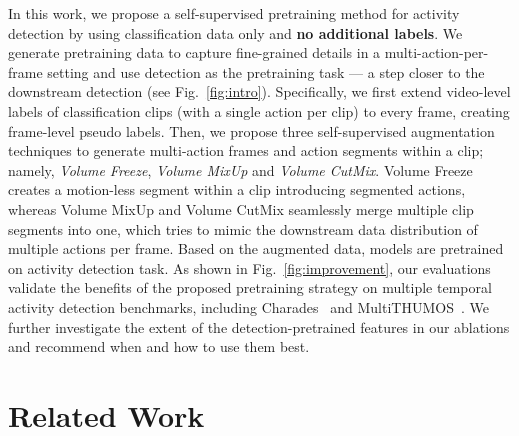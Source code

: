 \documentclass[10pt,twocolumn,letterpaper]{article}
\newcommand{\fref}[1]{Fig.~\ref{#1}}
\begin{document}
In this work, we propose a self-supervised pretraining method for activity detection by using classification data only and \textbf{no additional labels}. We generate pretraining data to capture fine-grained details in a multi-action-per-frame setting and use detection as the pretraining task --- a step closer to the downstream detection (see \fref{fig:intro}). Specifically, we first extend video-level labels of classification clips (with a single action per clip) to every frame, creating frame-level pseudo labels. Then, we propose three self-supervised augmentation techniques to generate multi-action frames and action segments within a clip; namely, \textit{Volume Freeze}, \textit{Volume MixUp} and \textit{Volume CutMix}. Volume Freeze creates a motion-less segment within a clip introducing segmented actions, whereas Volume MixUp and Volume CutMix seamlessly merge multiple clip segments into one, which tries to mimic the downstream data distribution of multiple actions per frame. Based on the augmented data, models are pretrained on activity detection task. As shown in \fref{fig:improvement}, our evaluations validate the benefits of the proposed pretraining strategy on multiple temporal activity detection benchmarks, including Charades~\cite{sigurdsson2016hollywood} and MultiTHUMOS~\cite{yeung2018every}. We further investigate the extent of the detection-pretrained features in our ablations and recommend when and how to use them best. 

\vspace{-1mm}




\section{Related Work}
\label{sec:related}
\end{document}
